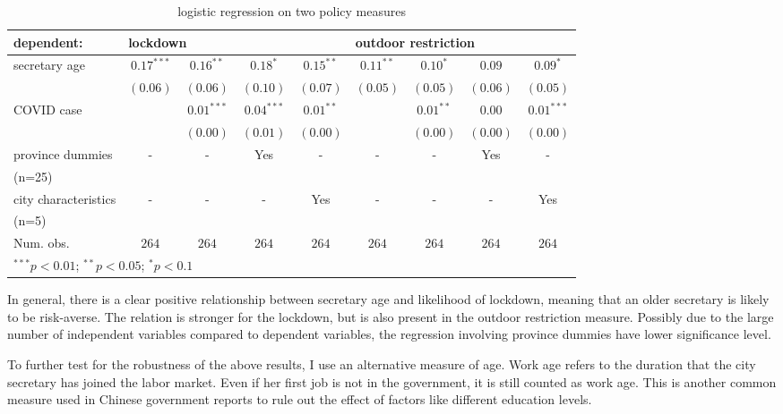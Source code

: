 \documentclass{article}
\begin{document}
\begin{CJK}{UTF8}{gbsn}
\begin{table}[H]
\caption{logistic regression on two policy measures}
\begin{center}
\begin{tabular}{l c c c c c c c c}
\hline
dependent: & \multicolumn{4}{l}{lockdown}  & \multicolumn{4}{l}{outdoor restriction}\\
\hline
secretary age  & $0.17^{***}$ & $0.16^{**}$  & $0.18^{*}$   & $0.15^{**}$ & $0.11^{**}$ & $0.10^{*}$  & $0.09$    & $0.09^{*}$   \\
               & $(0.06)$     & $(0.06)$     & $(0.10)$     & $(0.07)$    & $(0.05)$    & $(0.05)$    & $(0.06)$  & $(0.05)$     \\
COVID case     &              & $0.01^{***}$ & $0.04^{***}$ & $0.01^{**}$ &             & $0.01^{**}$ & $0.00$    & $0.01^{***}$ \\
               &              & $(0.00)$     & $(0.01)$     & $(0.00)$    &             & $(0.00)$    & $(0.00)$  & $(0.00)$     \\
province dummies &-&-&Yes&-&-&-&Yes&- \\
(n=25)\\
city characteristics &-&-&-&Yes&-&-&-&Yes \\
(n=5)\\

\hline
Num. obs.      & $264$        & $264$        & $264$        & $264$        & $264$        & $264$        & $264$       & $264$        \\
\hline
\multicolumn{9}{l}{\scriptsize{$^{***}p<0.01$; $^{**}p<0.05$; $^{*}p<0.1$}}
\end{tabular}
\label{Table 1}
\end{center}
\end{table}


In general, there is a clear positive relationship between secretary age and likelihood of lockdown, meaning that an older secretary is likely to be risk-averse. The relation is stronger for the lockdown, but is also present in the outdoor restriction measure.  Possibly due to the large number of independent variables compared to dependent variables, the regression involving province dummies have lower significance level.

To further test for the robustness of the above results, I use an alternative measure of age. Work age refers to the duration that the city secretary has joined the labor market. Even if her first job is not in the government, it is still counted as work age. This is another common measure used in Chinese government reports to rule out the effect of factors like different education levels. 


\end{CJK}
\end{document}

